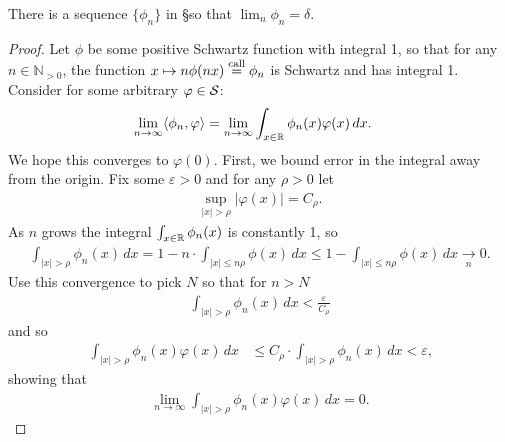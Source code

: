    \begin{thm}
      There is a sequence $\{\phi_n\}$ in \S so that $\lim_n \phi_n = \delta$.
    \end{thm}
    \begin{proof}
      Let $\phi$ be some positive Schwartz function with integral 1, so that for any $n\in\mathbb{N}_{>0}$, the function $x\mapsto n\phi(nx) \call \phi_n$ is Schwartz and has integral 1.
      Consider for some arbitrary $\varphi\in\S$:
      \begin{align*}
        \lim_{n\rightarrow\infty}\langle\phi_n,\varphi\rangle 
        &=\lim_{n\rightarrow\infty}\int_{x\in\R} \phi_n(x)\varphi(x)\,dx\text{.}
      \end{align*}
      We hope this converges to $\varphi(0)$.
      First, we bound error in the integral away from the origin.
      Fix some $\varepsilon>0$ and for any $\rho>0$ let 
      \begin{align*}
        \sup_{|x|>\rho} |\varphi(x)| = C_\rho \text{.}
      \end{align*}
      As $n$ grows the integral $\int_{x\in\R}\phi_n(x)$ is constantly 1, so
      \begin{align*}
        \int_{|x|>\rho} \phi_n(x)\,dx
        = 1-n\cdot\int_{|x|\le n\rho} \phi(x)\,dx
        \le 1-\int_{|x|\le n\rho} \phi(x)\,dx
        \underset n\longrightarrow 0 \text{.}
      \end{align*}
      Use this convergence to pick $N$ so that for $n>N$
      \begin{align*}
        \int_{|x|>\rho} \phi_n(x)\,dx
        < \frac\varepsilon{C_\rho}
      \end{align*}
      and so
      \begin{align*}
        \int_{|x|>\rho} \phi_n(x)\varphi(x)\,dx
        &\le C_\rho \cdot \int_{|x|>\rho} \phi_n(x)\,dx
        < \varepsilon \text{,}
      \end{align*}
      showing that
      \begin{align*}
        \lim_{n\rightarrow\infty} \int_{|x|>\rho} \phi_n(x)\varphi(x)\,dx
        = 0 \text{.}
      \end{align*}


\end{proof}
